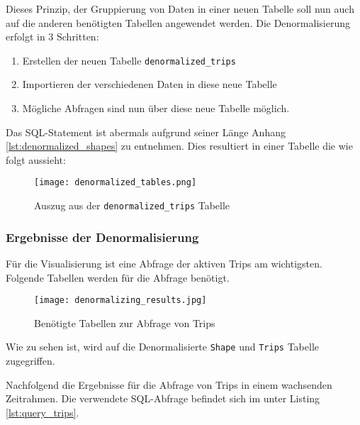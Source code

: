   Dieses Prinzip, der Gruppierung von Daten in einer neuen Tabelle soll nun auch auf die anderen benötigten Tabellen angewendet werden. Die Denormalisierung erfolgt in 3 Schritten:

  \begin{enumerate}
    \item Erstellen der neuen Tabelle \texttt{denormalized\_trips}
    \item Importieren der verschiedenen Daten in diese neue Tabelle
    \item Mögliche Abfragen sind nun über diese neue Tabelle möglich.
  \end{enumerate}

  Das SQL-Statement ist abermals aufgrund seiner Länge Anhang \ref{lst:denormalized_shapes} zu entnehmen. Dies resultiert in einer Tabelle die wie folgt aussieht:

  \begin{figure}[htbp]
    \begin{center}
      \texttt{[image: denormalized\_tables.png]}
      \caption{Auszug aus der \texttt{denormalized\_trips} Tabelle}
      \label{fig:denormalized_table}
    \end{center}
  \end{figure}  

  \subsubsection*{Ergebnisse der Denormalisierung}
  \label{ssub:ergebnisse_der_denormalisierung}
    Für die Visualisierung ist eine Abfrage der aktiven Trips am wichtigsten.
    Folgende Tabellen werden für die Abfrage benötigt.

    \begin{figure}[htbp]
      \begin{center}
        \texttt{[image: denormalizing\_results.jpg]}
        \caption{Benötigte Tabellen zur Abfrage von Trips}
        \label{fig:denormalizing_results}
      \end{center}
    \end{figure}

    Wie zu sehen ist, wird auf die Denormalisierte \texttt{Shape} und \texttt{Trips} Tabelle zugegriffen.

    Nachfolgend die Ergebnisse für die Abfrage von Trips in einem wachsenden Zeitrahmen. Die verwendete SQL-Abfrage befindet sich im  unter Listing \ref{lst:query_trips}.

